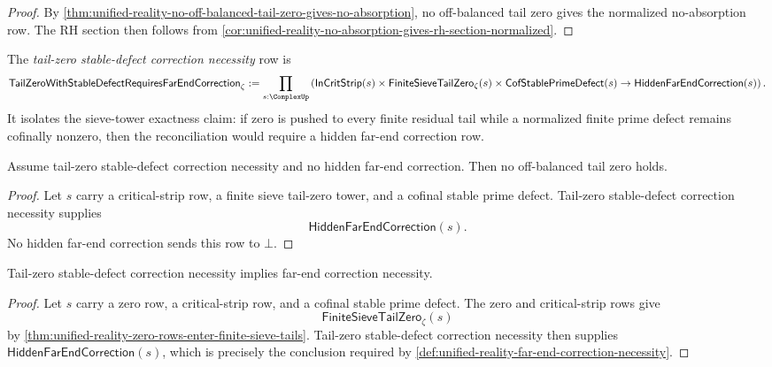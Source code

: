 \begin{proof}
By
\autoref{thm:unified-reality-no-off-balanced-tail-zero-gives-no-absorption},
no off-balanced tail zero gives the normalized no-absorption row.  The RH
section then follows from
\autoref{cor:unified-reality-no-absorption-gives-rh-section-normalized}.
\end{proof}

\begin{definition}
\label{def:unified-reality-tail-zero-stable-defect-correction-necessity}
The \emph{tail-zero stable-defect correction necessity} row is
$$
\mathsf{TailZeroWithStableDefectRequiresFarEndCorrection}_{\zeta}
:=
\prod_{s:\ComplexUp}
\left(
\mathsf{InCritStrip}(s)
\times
\mathsf{FiniteSieveTailZero}_{\zeta}(s)
\times
\mathsf{CofStablePrimeDefect}(s)
\to
\mathsf{HiddenFarEndCorrection}(s)
\right).
$$
It isolates the sieve-tower exactness claim: if zero is pushed to every
finite residual tail while a normalized finite prime defect remains
cofinally nonzero, then the reconciliation would require a hidden
far-end correction row.
\end{definition}

\begin{theorem}
\label{thm:unified-reality-tail-zero-correction-refusal-gives-no-off-balanced-tail-zero}
Assume tail-zero stable-defect correction necessity and no hidden far-end
correction.  Then no off-balanced tail zero holds.
\end{theorem}

\begin{proof}
Let $s$ carry a critical-strip row, a finite sieve tail-zero tower, and a
cofinal stable prime defect.  Tail-zero stable-defect correction
necessity supplies
$$
\mathsf{HiddenFarEndCorrection}(s).
$$
No hidden far-end correction sends this row to $\bot$.
\end{proof}

\begin{theorem}
\label{thm:unified-reality-sieve-tail-correction-refines-far-end-correction}
Tail-zero stable-defect correction necessity implies far-end correction
necessity.
\end{theorem}

\begin{proof}
Let $s$ carry a zero row, a critical-strip row, and a cofinal stable prime
defect.  The zero and critical-strip rows give
$$
\mathsf{FiniteSieveTailZero}_{\zeta}(s)
$$
by \autoref{thm:unified-reality-zero-rows-enter-finite-sieve-tails}.
Tail-zero stable-defect correction necessity then supplies
$\mathsf{HiddenFarEndCorrection}(s)$, which is precisely the conclusion
required by
\autoref{def:unified-reality-far-end-correction-necessity}.
\end{proof}


